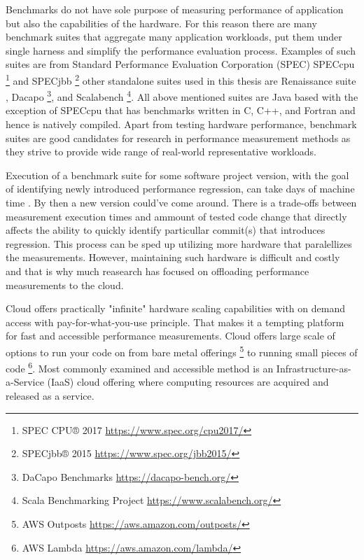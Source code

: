 Benchmarks do not have sole purpose of measuring performance of application but also the capabilities of the hardware.
For this reason there are many benchmark suites that aggregate many application workloads, put them under single harness and simplify the performance evaluation process.
Examples of such suites are from Standard Performance Evaluation Corporation (SPEC) SPECcpu \footnote{SPEC CPU® 2017 \url{https://www.spec.org/cpu2017/}} and SPECjbb \footnote{SPECjbb® 2015 \url{https://www.spec.org/jbb2015/}} other standalone suites used in this thesis are Renaissance suite \citet{prokopec2019renaissance}, Dacapo \footnote{DaCapo Benchmarks \url{https://dacapo-bench.org/}}, and Scalabench \footnote{Scala Benchmarking Project \url{https://www.scalabench.org/}}.
All above mentioned suites are Java based with the exception of SPECcpu that has benchmarks written in C, C++, and Fortran and hence is natively compiled.
Apart from testing hardware performance, benchmark suites are good candidates for research in performance measurement methods as they strive to provide wide range of real-world representative workloads.

Execution of a benchmark suite for some software project version, with the goal of identifying newly introduced performance regression, can take days of machine time .
By then a new version could've come around.
There is a trade-offs between measurement execution times and ammount of tested code change that directly affects the ability to quickly identify particullar commit(s) that introduces regression.
This process can be sped up utilizing more hardware that paralellizes the measurements.
However, maintaining such hardware is difficult and costly  and that is why much reasearch \cite{leitner2016patterns} \cite{laaber2019software} \cite{abedi2017conducting} has focused on offloading performance measurements to the cloud.

Cloud offers practically "infinite" hardware scaling capabilities with on demand access with pay-for-what-you-use principle.
That makes it a tempting platform for fast and accessible performance measurements.
Cloud offers large scale of options to run your code on from bare metal offerings \footnote{AWS Outposts \url{https://aws.amazon.com/outposts/}} to running small pieces of code \footnote{AWS Lambda \url{https://aws.amazon.com/lambda/}}.
Most commonly examined and accessible method is an Infrastructure-as-a-Service (IaaS) cloud offering where computing resources are acquired and released as a service.

